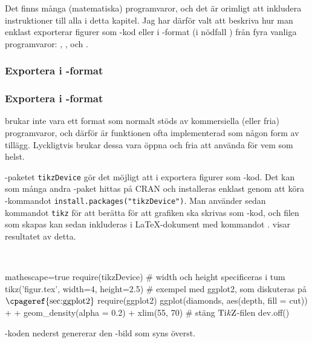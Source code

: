 \documentclass[lang=sv,ptsize=10pt,font=none,nomath,titles=bf,../../a4.tex]{subfiles}
\begin{document}
Det finns många (matematiska) programvaror, och det är orimligt att
inkludera instruktioner till alla i detta kapitel. Jag har därför valt
att beskriva hur man enklast exporterar figurer som \PGFTikZ-kod eller
i \PDF-format (i nödfall \PNG) från fyra vanliga programvaror:
\Rlogo, \MATLAB, \Mathematica och \gnuplot.

\subsubsection{Exportera i -format}

\subsubsection{Exportera i \PGFTikZ-format}
\PGFTikZ brukar inte vara ett format som normalt stöds av kommersiella
(eller fria) programvaror, och därför är funktionen ofta implementerad
som någon form av tillägg. Lyckligtvis brukar dessa vara öppna och fria
att använda för vem som helst.

\Rlogo-paketet \texttt{tikzDevice} \parencite{Sharpsteen12} gör det möjligt
att i \Rlogo exportera figurer som \PGFTikZ-kod. Det kan som många andra
\Rlogo-paket hittas på CRAN och installeras enklast genom att köra
\Rlogo-kommandot \verb|install.packages("tikzDevice")|. Man använder
sedan kommandot \texttt{tikz} för att berätta för \Rlogo att grafiken
ska skrivas som \PGFTikZ-kod, och filen som skapas kan sedan inkluderas
i \LaTeX-dokument med kommandot .
 visar resultatet av detta.

\begin{kod}[tbp]
	\centering
	\begin{minipage}{\textwidth}
		\centering
		
	\end{minipage}
	\\[1ex]
	\begin{minipage}{\textwidth}
		\begin{rcode*}{mathescape=true}
require(tikzDevice)
# width och height specificeras i tum
tikz('figur.tex', width=4, height=2.5)
# exempel med ggplot2, som diskuteras på $\text{\cpageref{sec:ggplot2}}$
require(ggplot2)
ggplot(diamonds, aes(depth, fill = cut)) +
  + geom_density(alpha = 0.2) + xlim(55, 70)
# stäng $\text{Ti\textit{k}Z}$-filen
dev.off()
		\end{rcode*}
	\end{minipage}
	\caption{\Rlogo-koden nederst genererar den \PGFTikZ-bild som
	syns överst.}
	\label{ex:tikzdevice}
\end{kod}
\end{document}
